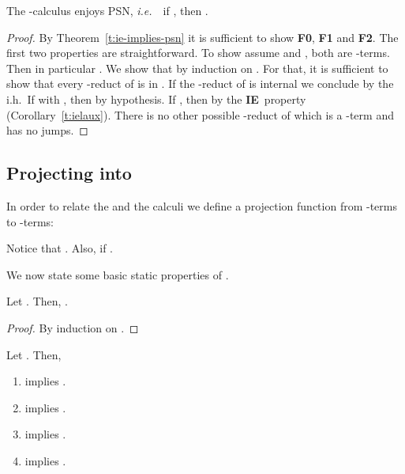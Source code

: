 \documentclass{LMCS}
\newcommand{\ie}{{\it  i.e.}~}
\renewcommand{\>}{\rightarrow}
\newcommand{\ih}{i.h.}
\newcommand{\iep}{{\bf IE}}
\begin{document}
\begin{cor}
\label{c:psn-lauxm}
The -calculus enjoys PSN, \ie\ if , then 
.
\end{cor}

\begin{proof} By Theorem~\ref{t:ie-implies-psn} it is sufficient to
show {\bf F0}, {\bf F1} and {\bf F2}. The first two properties are straightforward. 
To show  assume  and
, both are -terms.
Then in particular . We show that
 by induction on
.
For that, it is sufficient to show that every -reduct of  is
in .  If the -reduct of  is internal we conclude
by the \ih\ If  with , then  by hypothesis. If , then  by the
\iep\ property (Corollary~\ref{t:ielaux}).  There is no other possible -reduct of 
which is a  -term and has no jumps.
\end{proof}

\subsection{Projecting   into }
\label{s:projection}

In order to relate the  and the  calculi 
we define a projection function from -terms to -terms:

Notice that . Also,  if . 


We now state some basic static properties of .


\begin{lem}
\label{l:basic-properties-proj} Let . Then, 
.
\end{lem}

\begin{proof}
By induction on .
\end{proof}



\begin{lem}[Projection]
\label{l:projection}
Let . Then, 
\begin{enumerate}[\rm(1)]
\item \label{ppp-i}  implies .
\item\label{ppp-iii}   implies 
.
\item \label{ppp-iv}  implies .
\item \label{ppp-v}  implies .
\end{enumerate}
\end{lem}
\end{document}
